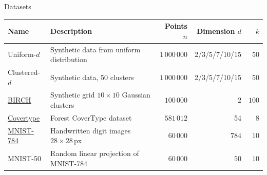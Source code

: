 \documentclass[10pt, compress]{beamer}
\begin{document}
\begin{frame}{Datasets}
  \small
\centering
\label{tab:datasets}
\begin{tabularx}{\textwidth}{lXrrr}
\hline
Name & Description & Points $n$ & Dimension $d$ & $k$ \\
\hline
Uniform-$d$ & Synthetic data from uniform distribution & $1 \, 000 \, 000$ & 2/3/5/7/10/15 & 50 \\
Clustered-$d$ & Synthetic data, 50 clusters & $1 \, 000 \, 000$ & 2/3/5/7/10/15 & 50 \\
\href{http://cs.joensuu.fi/sipu/datasets/}{BIRCH} & Synthetic grid $10\times 10$ Gaussian clusters & $100 \, 000$ & $2$ & $100$ \\
\href{https://archive.ics.uci.edu/ml/datasets/Covertype}{Covertype} & Forest CoverType dataset & $581 \, 012$ & 54 & 8 \\
\href{http://yann.lecun.com/exdb/mnist/}{MNIST-784} & Handwritten digit images $28\times 28\,\mathrm{px}$ & $60 \, 000$ & $784$ & $10$ \\
MNIST-50 & Random linear projection of MNIST-784 & $60 \, 000$ & $50$ & $10$ \\
\hline
\end{tabularx}
\end{frame}
\end{document}
